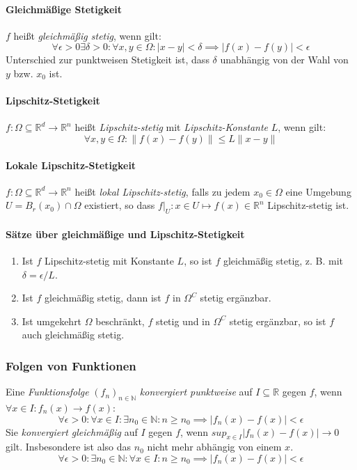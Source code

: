\documentclass[a4paper, 9pt, DIV=24]{scrartcl}
\newcommand{\N}{\mathbb{N}}
\newcommand{\R}{\mathbb{R}}
\begin{document}
\paragraph{Gleichmäßige Stetigkeit}
$f$ heißt \emph{gleichmäßig stetig}, wenn gilt:
\[\forall\epsilon>0\exists\delta>0: \forall x,y \in \Omega: |x-y| < \delta \implies |f(x) - f(y)| < \epsilon \]
Unterschied zur punktweisen Stetigkeit ist, dass $\delta$ unabhängig von der Wahl von $y$ bzw. $x_0$ ist.

\paragraph{Lipschitz-Stetigkeit}
$f: \Omega \subseteq \R^d \rightarrow \R^n$ heißt \emph{Lipschitz-stetig} mit \emph{Lipschitz-Konstante} $L$, wenn gilt:
\[ \forall x,y\in\Omega: \|f(x)-f(y)\| \leq L\|x-y\|\]

\paragraph{Lokale Lipschitz-Stetigkeit}
$f: \Omega \subseteq \R^d \rightarrow \R^n$ heißt \emph{lokal Lipschitz-stetig},
falls zu jedem $x_0\in\Omega$ eine Umgebung $U = B_r(x_0)\cap\Omega$ existiert,
so dass $f|_U : x \in U \mapsto f(x) \in \R^n$ Lipschitz-stetig ist.


\paragraph{Sätze über gleichmäßige und Lipschitz-Stetigkeit}
\begin{enumerate}[label={(}\arabic*{)}]
 \item Ist $f$ Lipschitz-stetig mit Konstante $L$, so ist $f$ gleichmäßig stetig, z. B. mit $\delta = \epsilon/L$.
 \item Ist $f$ gleichmäßig stetig, dann ist $f$ in $\Omega^C$ stetig ergänzbar.
 \item Ist umgekehrt $\Omega$ beschränkt, $f$ stetig und in $\Omega^C$ stetig ergänzbar, so ist $f$ auch gleichmäßig stetig.
\end{enumerate}

\subsubsection{Folgen von Funktionen}
Eine \emph{Funktionsfolge} $(f_n)_{n\in\N}$ \emph{konvergiert punktweise} auf $I \subseteq \R$ gegen $f$, wenn $\forall x\in I: f_n(x) \rightarrow f(x)$:
\[ \forall \epsilon > 0: \forall x \in I: \exists n_0 \in \N: n \geq n_0 \implies |f_n(x)-f(x)| < \epsilon \]
Sie \emph{konvergiert gleichmäßig} auf $I$ gegen $f$, wenn $sup_{x\in I} |f_n(x) - f(x)| \rightarrow 0$ gilt.
Insbesondere ist also das $n_0$ nicht mehr abhängig von einem $x$.
\[ \forall \epsilon > 0: \exists n_0 \in \N: \forall x \in I: n \geq n_0 \implies |f_n(x)-f(x)| < \epsilon \]
\end{document}
